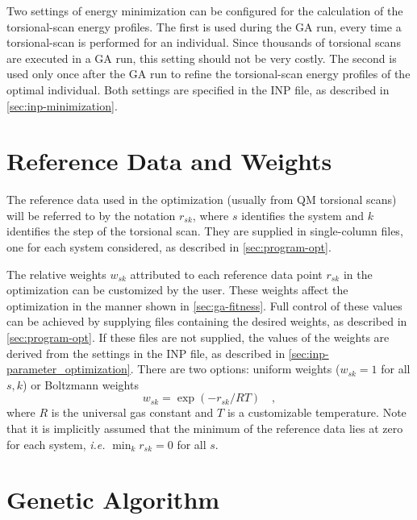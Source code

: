 \documentclass[10pt,a4paper,openany]{memoir}
\numberwithin{equation}{section}
\begin{document}
Two settings of energy minimization can be configured for the calculation of the torsional-scan energy profiles.
The first is used during the GA run, every time a torsional-scan is performed for an individual.
Since thousands of torsional scans are executed in a GA run, this setting should not be very costly.
The second is used only once after the GA run to refine the torsional-scan energy profiles of the optimal individual. Both settings are specified in the INP file, as described in \autoref{sec:inp-minimization}.


\section{Reference Data and Weights}
\label{sec:ga-fitness-wei}

The reference data used in the optimization (usually from QM torsional
scans) will be referred to by the notation $r_{sk}$, where $s$
identifies the system and $k$ identifies the step of the torsional
scan.  They are supplied in single-column files, one for each system
considered, as described in \autoref{sec:program-opt}.

The relative weights $w_{sk}$ attributed to each reference data point
$r_{sk}$ in the optimization can be customized by the user.  These
weights affect the optimization in the manner shown in \autoref{sec:ga-fitness}.
Full control of these values can be achieved by
supplying files containing the desired weights, as described in
\autoref{sec:program-opt}. If these files are not supplied, the values
of the weights are derived from the settings in the INP file, as
described in \autoref{sec:inp-parameter_optimization}.  There are two
options: uniform weights ($w_{sk} = 1$ for all $s,k$) or Boltzmann
weights
\begin{equation*}
  w_{sk} = \exp{(-r_{sk}/RT)} \quad , 
\end{equation*}
where $R$ is the universal gas constant and $T$ is a customizable temperature.
Note that it is implicitly assumed that the minimum of the reference data
lies at zero for each system, \textit{i.e.} $\min_k{r_{sk}} = 0$ for all $s$.

\section{Genetic Algorithm}
\label{sec:ga}
\end{document}
